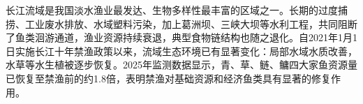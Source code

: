 长江流域是我国淡水渔业最发达、生物多样性最丰富的区域之一。长期的过度捕捞、工业废水排放、水域塑料污染，加上葛洲坝、三峡大坝等水利工程，共同阻断了鱼类洄游通道，渔业资源持续衰退，典型食物链结构也随之退化。自2021年1月1日实施长江十年禁渔政策以来，流域生态环境已有显著变化：局部水域水质改善，水草等水生植被逐步恢复。2025年监测数据显示，青、草、鲢、鳙四大家鱼资源量已恢复至禁渔前的约1.8倍，表明禁渔对基础资源和经济鱼类具有显著的修复作用。
